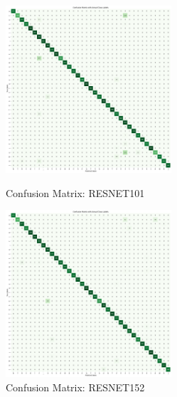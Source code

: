 \begin{figure}[h!]
    \centering
    \includegraphics[width=0.55\textwidth]{Assets/confusion_matrix/RESNET101.png}
    \caption{Confusion Matrix: RESNET101}
    \vspace{1.5cm}
    \includegraphics[width=0.55\textwidth]{Assets/confusion_matrix/RESNET152.png}
    \caption{Confusion Matrix: RESNET152}
\end{figure}

\newpage

